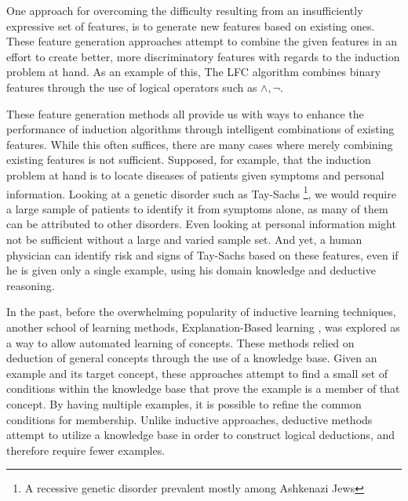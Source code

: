 \documentclass[twoside,11pt]{article}
\theoremstyle{definition}
\begin{document}
One approach for overcoming the difficulty resulting from an insufficiently expressive set of features, is to generate new features based on existing ones. 
These feature generation approaches attempt to combine the given features in an effort to create better, more discriminatory features with regards to the induction problem at hand. As an example of this, The LFC algorithm \cite{ragavan1993complex} combines binary features through the use of logical operators such as $\land ,\lnot$.

These feature generation methods all provide us with ways to enhance the performance of induction algorithms through intelligent combinations of existing features. While this often suffices, there are many cases where merely combining existing features is not sufficient. 
Supposed, for example, that the induction problem at hand is to locate diseases of patients given symptoms and personal information. 
Looking at a genetic disorder such as Tay-Sachs \footnote{A recessive genetic disorder prevalent mostly among Ashkenazi Jews}, we would require a large sample of patients to identify it from symptoms alone, as many of them can be attributed to other disorders. Even looking at personal information might not be sufficient without a large and varied sample set. And yet, a human physician can identify risk and signs of Tay-Sachs based on these features, even if he is given only a single example, using his domain knowledge and deductive reasoning.

In the past, before the overwhelming popularity of inductive learning techniques, another school of learning methods, Explanation-Based learning \cite{dejong1986explanation}, was explored as a way to allow automated learning of concepts. These methods relied on deduction of general concepts through the use of a knowledge base. Given an example and its target concept, these approaches attempt to find a small set of conditions within the knowledge base that prove the example is a member of that concept. By having multiple examples, it is possible to refine the common conditions for membership.
Unlike inductive approaches, deductive methods attempt to utilize a knowledge base in order to construct logical deductions, and therefore require fewer examples.
\end{document}
